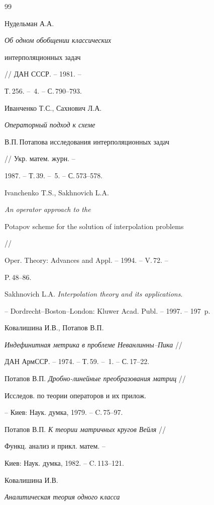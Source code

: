 \begin{thebibliography}{99}







Нудельман А.А. {\em Об одном обобщении классических


интерполяционных задач} // ДАН СССР. -- 1981. --


Т.\,256. -- \No\,4. -- С.\,790--793.




Иванченко Т.С., Сахнович Л.А. {\em Операторный подход к схеме


В.П.\,Потапова исследования интерполяционных задач} // Укр. матем. журн. --


1987. -- Т.\,39. -- \No\,5. -- С.\,573--578.




Ivanchenko T.S., Sakhnovich L.A. {\em An operator approach to the


Potapov scheme for the solution of interpolation problems} //


Oper. Theory: Advances and Appl. -- 1994. -- V.\,72. --


P.\,48--86.




Sakhnovich L.A. {\em Interpolation theory and its applications}.


-- Dordrecht--Boston--London: Kluwer Acad. Publ. -- 1997. -- 197~p.




Ковалишина И.В., Потапов В.П.


{\em Индефинитная метрика в проблеме Неванлинны--Пика } //


ДАН АрмССР. -- 1974. -- Т.\,59. -- \No\,1. -- С.\,17--22.




Потапов В.П. {\em Дробно-линейные преобразования матриц} //


Исследов. по теории операторов и их прилож.


-- Киев: Наук. думка, 1979. -- C.\,75--97.




Потапов В.П. {\em К теории матричных кругов Вейля} //


Функц. анализ и прикл. матем. --


Киев: Наук. думка, 1982. -- C.\,113--121.




Ковалишина И.В. {\em Аналитическая теория одного класса


}
\end{thebibliography}
